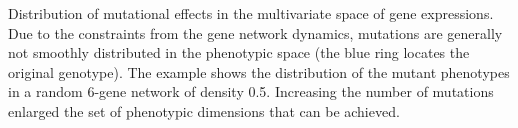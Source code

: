 \documentclass[10pt,a4paper]{article}
\begin{document}
\begin{appendices}
	{\color{Gray}Distribution of mutational effects in the multivariate space of gene expressions. Due to the constraints from the gene network dynamics, mutations are generally not smoothly distributed in the phenotypic space (the blue ring locates the original genotype). The example shows the distribution of the mutant phenotypes in a random 6-gene network of density 0.5. Increasing the number of mutations enlarged the set of phenotypic dimensions that can be achieved.}




\end{appendices}
\end{document}

